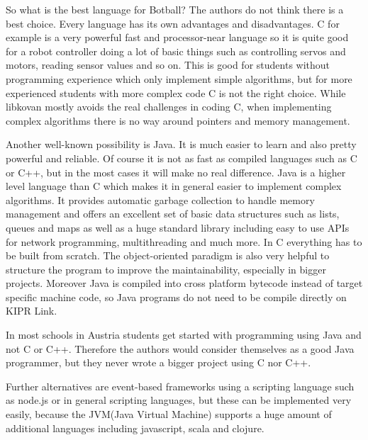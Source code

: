 \documentclass{juniorjournal}
\begin{document}
So what is the best language for Botball?
The authors do not think there is a best choice.
Every language has its own advantages and disadvantages.
C for example is a very powerful fast and processor-near language so it is quite good for a robot controller doing a lot of basic things such as controlling servos and motors, reading sensor values and so on.
This is good for students without programming experience which only implement simple algorithms, but for more experienced students with more complex code C is not the right choice.
While libkovan mostly avoids the real challenges in coding C, when implementing complex algorithms there is no way around pointers and memory management.

Another well-known possibility is Java\cite{Java}.
It is much easier to learn and also pretty powerful and reliable.
Of course it is not as fast as compiled languages such as C or C++, but in the most cases it will make no real difference.
Java is a higher level language than C which makes it in general easier to implement complex algorithms.
It provides automatic garbage collection to handle memory management
and offers an excellent set of basic data structures such as lists, queues and maps as well as a huge standard library including easy to use APIs for network programming, multithreading and much more.
In C everything has to be built from scratch.
The object-oriented paradigm is also very helpful to structure the program
to improve the maintainability, especially in bigger projects.
Moreover Java is compiled into cross platform bytecode instead of target specific machine code, so Java programs do not need to be compile directly on KIPR Link.

In most schools in Austria students get started with programming using Java and not C or C++.
Therefore the authors would consider themselves as a good Java programmer,
but they never wrote a bigger project using C nor C++.

Further alternatives are event-based frameworks using a scripting language
such as node.js\cite{node} or in general scripting languages, but these can be implemented very easily,
because the JVM\cite{JVM}(Java Virtual Machine) supports a huge amount of additional languages
including javascript, scala and clojure.
\end{document}
